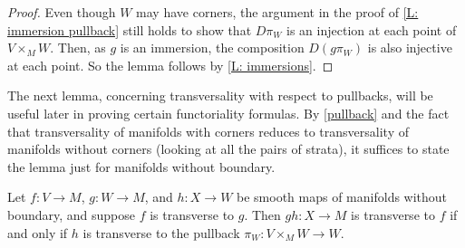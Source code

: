 \begin{proof}
	Even though $W$ may have corners, the argument in the proof of \cref{L: immersion pullback} still holds to show that $D \pi_W$ is an injection at each point of $V \times_M W$.
	Then, as $g$ is an immersion, the composition $D(g \pi_W)$ is also injective at each point.
	So the lemma follows by \cref{L: immersions}.
\end{proof}

The next lemma, concerning transversality with respect to pullbacks, will be useful later in proving certain functoriality formulas.
By \cref{pullback} and the fact that transversality of manifolds with corners reduces to transversality of manifolds without corners (looking at all the pairs of strata), it suffices to state the lemma just for manifolds without boundary.

\begin{lemma}\label{L: transverse to pullback}
	Let $f \colon V \to M$, $g \colon W \to M$, and $h \colon X \to W$ be smooth maps of manifolds without boundary, and suppose $f$ is transverse to $g$.
	Then $gh \colon X \to M$ is transverse to $f$ if and only if $h$ is transverse to the pullback $\pi_W \colon V \times_M W \to W$.
\end{lemma}


